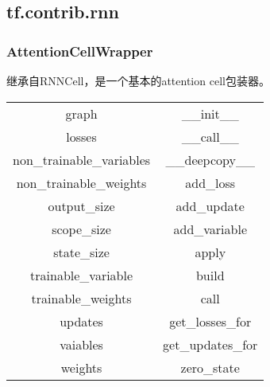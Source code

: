 \subsection{tf.contrib.rnn}
\subsubsection{AttentionCellWrapper}
继承自RNNCell，是一个基本的attention cell包装器。\newline
\begin{tabular}{|c|c|}
	graph&\_\_init\_\_\\
	losses&\_\_call\_\_\\
	non\_trainable\_variables&\_\_deepcopy\_\_\\
	non\_trainable\_weights&add\_loss\\
	output\_size&add\_update\\
	scope\_size&add\_variable\\
	state\_size&apply\\
	trainable\_variable&build\\
	trainable\_weights&call\\
	updates&get\_losses\_for\\
	vaiables&get\_updates\_for\\
	weights&zero\_state\\
\end{tabular}

